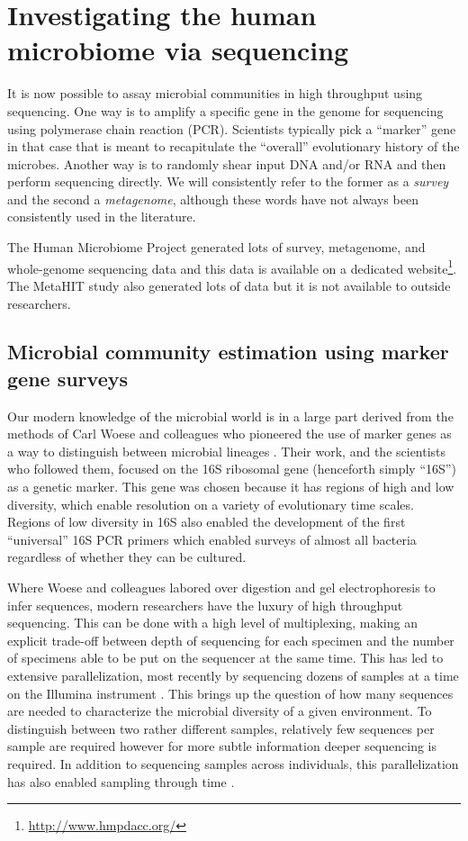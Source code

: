 \documentclass{amsart}
\begin{document}
\section{Investigating the human microbiome via sequencing}
It is now possible to assay microbial communities in high throughput using sequencing.
One way is to amplify a specific gene in the genome for sequencing using polymerase chain reaction (PCR).
Scientists typically pick a ``marker'' gene in that case that is meant to recapitulate the ``overall'' evolutionary history of the microbes.
Another way is to randomly shear input DNA and/or RNA and then perform sequencing directly.
We will consistently refer to the former as a \textit{survey} and the second a \textit{metagenome}, although these words have not always been consistently used in the literature.

The Human Microbiome Project \citep{methe2012framework} generated lots of survey, metagenome, and whole-genome sequencing data and this data is available on a dedicated website\footnote{\url{http://www.hmpdacc.org/}}.
The MetaHIT study \citep{qin2010human} also generated lots of data but it is not available to outside researchers.

\subsection{Microbial community estimation using marker gene surveys}
Our modern knowledge of the microbial world is in a large part derived from the methods of Carl Woese and colleagues who pioneered the use of marker genes as a way to distinguish between microbial lineages \citep{fox1977comparative}.
Their work, and the scientists who followed them, focused on the 16S ribosomal gene (henceforth simply ``16S'') as a genetic marker.
This gene was chosen because it has regions of high and low diversity, which enable resolution on a variety of evolutionary time scales.
Regions of low diversity in 16S also enabled the development of the first ``universal'' 16S PCR primers \citep{lane1985rapid} which enabled surveys of almost all bacteria regardless of whether they can be cultured.

Where Woese and colleagues labored over digestion and gel electrophoresis to infer sequences, modern researchers have the luxury of high throughput sequencing.
This can be done with a high level of multiplexing, making an explicit trade-off between depth of sequencing for each specimen and the number of specimens able to be put on the sequencer at the same time.
This has led to extensive parallelization, most recently by sequencing dozens of samples at a time on the Illumina instrument \citep{degnan2011illumina,caporaso2012ultra}.
This brings up the question of how many sequences are needed to characterize the microbial diversity of a given environment.
To distinguish between two rather different samples, relatively few sequences per sample are required \citep{kuczynski2010microbial} however for more subtle information deeper sequencing is required.
In addition to sequencing samples across individuals, this parallelization has also enabled sampling through time \citep[e.g.][]{caporaso2011moving}.
\end{document}
